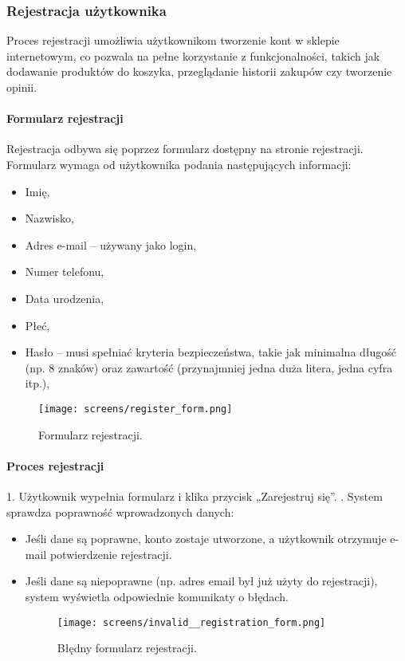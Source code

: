 \documentclass[12pt,a4paper,oneside]{article}
\theoremstyle{definition}
\numberwithin{equation}{section}
\begin{document}
\subsubsection{Rejestracja użytkownika}
Proces rejestracji umożliwia użytkownikom tworzenie kont w sklepie internetowym, co pozwala na pełne korzystanie z funkcjonalności, takich jak dodawanie produktów do koszyka, przeglądanie historii zakupów czy tworzenie opinii.

\paragraph{Formularz rejestracji}
Rejestracja odbywa się poprzez formularz dostępny na stronie rejestracji. Formularz wymaga od użytkownika podania następujących informacji:
\begin{itemize}
    \item Imię,
    \item Nazwisko,
    \item Adres e-mail – używany jako login,
    \item Numer telefonu,
    \item Data urodzenia,
    \item Płeć,
    \item Hasło – musi spełniać kryteria bezpieczeństwa, takie jak minimalna długość (np. 8 znaków) oraz zawartość (przynajmniej jedna duża litera, jedna cyfra itp.),
\end{itemize}

\begin{figure}[H]
    \centering
    \texttt{[image: screens/register\_form.png]}
    \caption{Formularz rejestracji.}
    \label{fig:registration_form}
\end{figure}

\paragraph{Proces rejestracji}
1. Użytkownik wypełnia formularz i klika przycisk „Zarejestruj się”. . System sprawdza poprawność wprowadzonych danych:
   \begin{itemize}
       \item Jeśli dane są poprawne, konto zostaje utworzone, a użytkownik otrzymuje e-mail potwierdzenie rejestracji.
       \item Jeśli dane są niepoprawne (np. adres email był już użyty do rejestracji), system wyświetla odpowiednie komunikaty o błędach.
       \begin{figure}[H]
        \centering
        \texttt{[image: screens/invalid\_\_registration\_form.png]}
        \caption{Błędny formularz rejestracji.}
        \label{fig:invalid_registration_form}
    \end{figure}
   \end{itemize}
\end{document}
